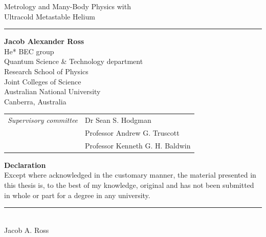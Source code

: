 



\newpage
\begin{flushleft}
\Large{Metrology and Many-Body Physics with \\Ultracold Metastable Helium}
\vspace{0.1cm}
\hrule
\vspace{1cm}
\large{\textbf{Jacob Alexander Ross\\}}
He* BEC group\\
Quantum Science \& Technology department\\
Research School of Physics\\
Joint Colleges of Science\\
Australian National University\\
Canberra, Australia

\vspace{1cm}
\begin{table}[h]
\begin{tabular}{c l}
\emph{\large{Supervisory committee}} & \large{Dr Sean S. Hodgman}\\
                              & \large{Professor Andrew G. Truscott}\\
                              & \large{Professor Kenneth G. H. Baldwin}
\end{tabular}
\end{table}

\vspace{2cm}
\large{\textbf{Declaration\\}}
Except where acknowledged in the customary manner, the material presented in this thesis is, to the best of my knowledge, original and has not been submitted in whole or part for a degree in any university.\\
\end{flushleft}
\begin{flushright}
\vspace{0.5cm}
\rule{3cm}{1pt}\\
Jacob A. Ross
\end{flushright}

